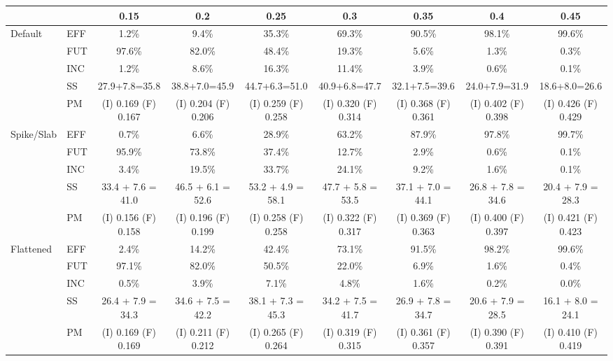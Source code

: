 \documentclass[12pt]{article}
\begin{document}
\begin{center}
\begin{tabular}{ll|ccccccc}
	&		&	0.15	&	0.2	&	0.25	&	0.3	&	0.35	&	0.4	&	0.45	\\
\hline
Default	&	EFF	&	1.2\%	&	9.4\%	&	35.3\%	&	69.3\%	&	90.5\%	&	98.1\%	&	99.6\%	\\
	&	FUT	&	97.6\%	&	82.0\%	&	48.4\%	&	19.3\%	&	5.6\%	&	1.3\%	&	0.3\%	\\
	&	INC	&	1.2\%	&	8.6\%	&	16.3\%	&	11.4\%	&	3.9\%	&	0.6\%	&	0.1\%	\\
	&	SS	&	27.9+7.8=35.8	&	38.8+7.0=45.9	&	44.7+6.3=51.0	&	40.9+6.8=47.7	&	32.1+7.5=39.6	&	24.0+7.9=31.9	&	18.6+8.0=26.6	\\
	&	PM	&	(I) 0.169 (F) 0.167	&	(I) 0.204 (F) 0.206	&	(I) 0.259 (F) 0.258	&	(I) 0.320 (F) 0.314	&	(I) 0.368 (F) 0.361	&	(I) 0.402 (F) 0.398	&	(I) 0.426 (F) 0.429	\\
\hline
Spike/Slab	&	EFF	&	0.7\%	&	6.6\%	&	28.9\%	&	63.2\%	&	87.9\%	&	97.8\%	&	99.7\%	\\
	&	FUT	&	95.9\%	&	73.8\%	&	37.4\%	&	12.7\%	&	2.9\%	&	0.6\%	&	0.1\%	\\
	&	INC	&	3.4\%	&	19.5\%	&	33.7\%	&	24.1\%	&	9.2\%	&	1.6\%	&	0.1\%	\\
	&	SS	&	33.4 + 7.6 = 41.0	&	46.5 + 6.1 = 52.6	&	53.2 + 4.9 = 58.1	&	47.7 + 5.8 = 53.5	&	37.1 + 7.0 = 44.1	&	26.8 + 7.8 = 34.6	&	20.4 + 7.9 = 28.3	\\
	&	PM	&	(I) 0.156 (F) 0.158	&	(I) 0.196 (F) 0.199	&	(I) 0.258 (F) 0.258	&	(I) 0.322 (F) 0.317	&	(I) 0.369 (F) 0.363	&	(I) 0.400 (F) 0.397	&	(I) 0.421 (F) 0.423	\\
\hline
Flattened	&	EFF	&	2.4\%	&	14.2\%	&	42.4\%	&	73.1\%	&	91.5\%	&	98.2\%	&	99.6\%	\\
	&	FUT	&	97.1\%	&	82.0\%	&	50.5\%	&	22.0\%	&	6.9\%	&	1.6\%	&	0.4\%	\\
	&	INC	&	0.5\%	&	3.9\%	&	7.1\%	&	4.8\%	&	1.6\%	&	0.2\%	&	0.0\%	\\
	&	SS	&	26.4 + 7.9 = 34.3	&	34.6 + 7.5 = 42.2	&	38.1 + 7.3 = 45.3	&	34.2 + 7.5 = 41.7	&	26.9 + 7.8 = 34.7	&	20.6 + 7.9 = 28.5	&	16.1 + 8.0 = 24.1	\\
	&	PM	&	(I) 0.169 (F) 0.169	&	(I) 0.211 (F) 0.212	&	(I) 0.265 (F) 0.264	&	(I) 0.319 (F) 0.315	&	(I) 0.361 (F) 0.357	&	(I) 0.390 (F) 0.391	&	(I) 0.410 (F) 0.419	\\
\end{tabular}
\end{center}
\normalsize
\newpage
\end{document}
